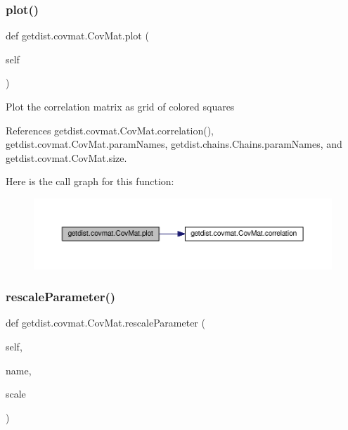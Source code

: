 \subsubsection{\texorpdfstring{plot()}{plot()}}
{\footnotesize\ttfamily def getdist.\+covmat.\+Cov\+Mat.\+plot (\begin{DoxyParamCaption}\item[{}]{self }\end{DoxyParamCaption})}

\begin{DoxyVerb}Plot the correlation matrix as grid of colored squares
\end{DoxyVerb}
 

References getdist.\+covmat.\+Cov\+Mat.\+correlation(), getdist.\+covmat.\+Cov\+Mat.\+param\+Names, getdist.\+chains.\+Chains.\+param\+Names, and getdist.\+covmat.\+Cov\+Mat.\+size.

Here is the call graph for this function\+:
\nopagebreak
\begin{figure}[H]
\begin{center}
\leavevmode
\includegraphics[width=350pt]{classgetdist_1_1covmat_1_1CovMat_a5621f155a5025de50ea2a248811d5781_cgraph}
\end{center}
\end{figure}
\mbox{\label{classgetdist_1_1covmat_1_1CovMat_a851295e6f66d18ab8392b0a4f33fb2bf}} 
\subsubsection{\texorpdfstring{rescale\+Parameter()}{rescaleParameter()}}
{\footnotesize\ttfamily def getdist.\+covmat.\+Cov\+Mat.\+rescale\+Parameter (\begin{DoxyParamCaption}\item[{}]{self,  }\item[{}]{name,  }\item[{}]{scale }\end{DoxyParamCaption})}

